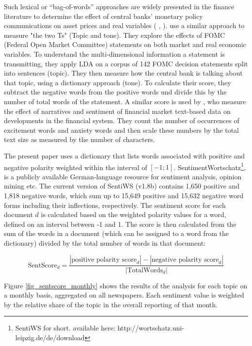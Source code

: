 \documentclass[12pt,a4paper,notitlepage]{article}
\begin{document}
Such lexical or “bag-of-words” approaches are widely presented in the finance literature to determine the effect of central banks' monetary policy communications on asset prices and real variables (\citet{nyman_news_2018} \citep{tetlock_giving_2007}, \citep{tetlock_more_2008}). \citet{hansen_shocking_2016} use a similar approach to measure "the two Ts" (Topic and tone). They explore the effects of FOMC (Federal Open Market Committee) statements on both market and real economic variables. To understand the multi-dimensional information a statement is transmitting, they apply LDA on a corpus of 142 FOMC decision statements split into sentences (topic). They then measure how the central bank is talking about that topic, using a dictionary approach (tone). To calculate their score, they subtract the negative words from the positive words und divide this by the number of total words of the statement. A similar score is used by \citet{nyman_news_2018}, who measure the effect of narratives and sentiment of financial market text-based data on developments in the financial system. They count the number of occurrences of excitement words and anxiety words and then scale these numbers by the total text size as measured by the number of characters.

The present paper uses a dictionary that lists words associated with positive and negative polarity weighted within the interval of $[-1; 1]$. SentimentWortschatz\footnote{SentiWS for short. available here: http://wortschatz.uni-leipzig.de/de/download}, is a publicly available German-language resource for sentiment analysis, opinion mining etc. The current version of SentiWS (v1.8b) contains 1,650 positive and 1,818 negative words, which sum up to 15,649 positive and 15,632 negative word forms including their inflections, respectively. The sentiment score for each document $d$ is calculated  based on the weighted polarity values for a word, defined on an interval between -1 and 1. The score is then calculated from the sum of the words in a document (which can be assigned to a word from the dictionary) divided by the total number of words in that document:
 
\begin{equation}
	\text{SentScore}_d = \frac{|\text{positive polarity score}_d| - |\text{negative polarity score}_d|}{|\text{TotalWords}_d|}
\end{equation}

Figure \ref{fig_sentscore_monthly} shows the results of the analysis for each topic on a monthly basis, aggregated on all newspapers. Each sentiment value is weighted by the relative share of the topic in the overall reporting of that month.
\end{document}
